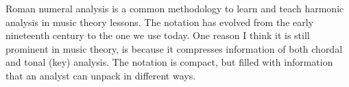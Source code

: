 

Roman numeral analysis is a common methodology to learn and
teach harmonic analysis in music theory lessons. The
notation has evolved from the early nineteenth century to
the one we use today. One reason I think it is still
prominent in music theory, is because it compresses
information of both chordal and tonal (key) analysis. The
notation is compact, but filled with information that an
analyst can unpack in different ways.


